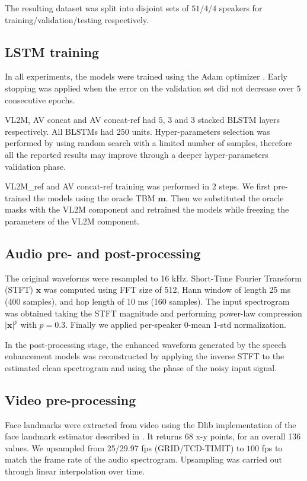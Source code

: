 \documentclass{article}
\begin{document}
The resulting dataset was split into disjoint sets of $51$/$4$/$4$ speakers for training/validation/testing respectively.

\subsection{LSTM training}
In all experiments, the models were trained using the Adam optimizer \cite{adam}.
Early stopping was applied when the error on the validation set did not decrease over $5$ consecutive epochs.

VL2M, AV concat and AV concat-ref had $5$, $3$ and $3$ stacked BLSTM layers respectively. All BLSTMs had $250$ units. Hyper-parameters selection was performed by using random search with a limited number of samples, therefore all the reported results may improve through a deeper hyper-parameters validation phase.

VL2M\_ref and AV concat-ref training was performed in $2$ steps. We first pre-trained the models using the oracle TBM $\mathbf{m}$. Then we substituted the oracle masks with the VL2M component and retrained the models while freezing the parameters of the VL2M component.

\subsection{Audio pre- and post-processing}
The original waveforms were resampled to 16 kHz. Short-Time Fourier Transform (STFT) $\mathbf{x}$ was computed using FFT size of 512, Hann window of length 25 ms (400 samples), and hop length of 10 ms (160 samples). The input spectrogram was obtained taking the STFT magnitude and performing power-law compression $\mathbf{\lvert x \rvert}^p$ with $p=0.3$. Finally we applied per-speaker 0-mean 1-std normalization.

In the post-processing stage, the enhanced waveform generated by the speech enhancement models was reconstructed by applying the inverse STFT to the estimated clean spectrogram and using the phase of the noisy input signal.

\subsection{Video pre-processing}
Face landmarks were extracted from video using the Dlib \cite{dlib09} implementation of the face landmark estimator described in \cite{Kazemi_2014_CVPR}. It returns 68 x-y points, for an overall 136 values.
We upsampled from 25/29.97 fps (GRID/TCD-TIMIT) to $100$ fps to match the frame rate of the audio spectrogram. Upsampling was carried out through linear interpolation over time. 
\end{document}
